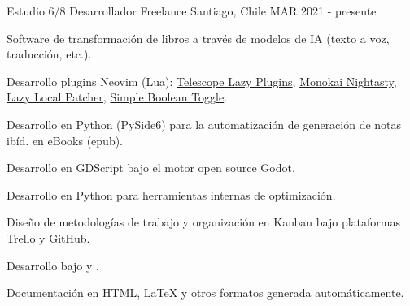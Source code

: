 

\begin{cventries}

  \cventry
    {Estudio 6/8} %
    {Desarrollador Freelance} %
    {Santiago, Chile} %
    {MAR 2021 - presente} %
    {
      \begin{cvitems} %
        \item {Software de transformación de libros a través de modelos de IA (texto a voz, traducción, etc.).}
        \item {Desarrollo plugins Neovim (Lua):
          \href{https://github.com/polirritmico/telescope-lazy-plugins.nvim}{Telescope Lazy Plugins},
          \href{https://github.com/polirritmico/monokai-nightasty.nvim}{Monokai Nightasty}},
          \href{https://github.com/polirritmico/lazy-local-patcher.nvim}{Lazy Local Patcher},
          \href{https://github.com/polirritmico/simple-boolean-toggle.nvim}{Simple Boolean Toggle}.
        \item {Desarrollo en Python (PySide6) para la automatización de generación de notas ibíd. en eBooks (epub).}
        \item {Desarrollo en GDScript bajo el motor open source Godot.}
        \item {Desarrollo en Python para herramientas internas de optimización.}
        \item {Diseño de metodologías de trabajo y organización en Kanban bajo plataformas Trello y GitHub.}
        \item {Desarrollo bajo  y .}
        \item {Documentación en HTML, LaTeX y otros formatos generada automáticamente.}
      \end{cvitems}
    }


\end{cventries}
